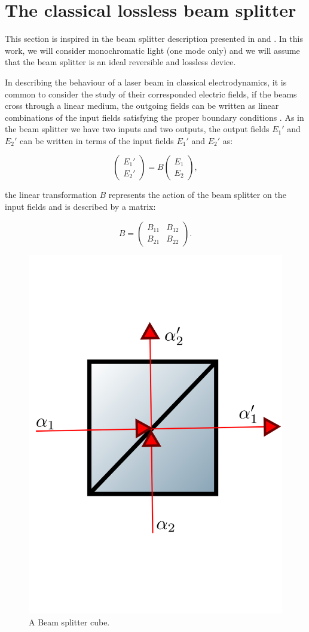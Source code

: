 \documentclass[12pt]{book}
\begin{document}
\section{The  classical lossless beam splitter}

This section is inspired in the beam splitter description presented in \cite{ludon} and \cite{leonhardt}. In this work, we will consider monochromatic light (one mode only) and we will assume that the beam splitter is an ideal reversible and lossless device.


In describing the behaviour of a laser beam in classical electrodynamics, it is common to consider the study of their corresponded electric fields, if the beams cross through a linear medium, the outgoing fields can be written as linear combinations of the input fields satisfying the proper boundary conditions \cite{jackson}. As in the beam splitter we have two inputs and two outputs, the output fields $E_{1}'$ and $E_{2}'$  can be written in terms of the input fields $E_{1}'$ and $E_{2}'$ as:

\begin{equation}
\begin{pmatrix} E_{1}' \\ E_{2}' \end{pmatrix}=B\begin{pmatrix} E_{1} \\ E_{2} \end{pmatrix},\label{rule}
\end{equation}

the linear transformation $B$ represents the action of the beam splitter on the input fields and is described by a matrix:

\begin{equation}
B=\begin{pmatrix} B_{11}& B_{12} \\B_{21} & B_{22} \end{pmatrix}.
\end{equation}

\begin{figure}[t!]
\centering
\includegraphics[width=5 cm,height=5 cm]{images/bS.png}
\caption{A Beam splitter cube.}
\label{fig:BS}
\end{figure}
\end{document}
